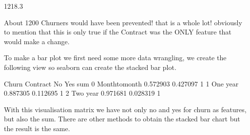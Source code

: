 \documentclass[letterpaper,10pt,english]{jupyterBook}
\begin{document}
\begin{sphinxVerbatim}[commandchars=\\\{\}]
\PYG{p}{[}\PYG{p}{]}
\end{sphinxVerbatim}

\begin{sphinxVerbatim}[commandchars=\\\{\}]
1218.3
\end{sphinxVerbatim}

\sphinxAtStartPar
About 1200 Churners would have been prevented! that is a whole lot! obviously to mention that this is only true if the Contract was the ONLY feature that would make a change.

\sphinxAtStartPar
To make a bar plot we first need some more data wrangling, we create the following view so seaborn can create the stacked bar plot.

\begin{sphinxVerbatim}[commandchars=\\\{\}]
  
\PYG{p}{[}\PYG{p}{]}  
\end{sphinxVerbatim}

\begin{sphinxVerbatim}[commandchars=\\\{\}]
Churn        Contract        No       Yes  sum
0      Month\PYGZhy{}to\PYGZhy{}month  0.572903  0.427097    1
1            One year  0.887305  0.112695    1
2            Two year  0.971681  0.028319    1
\end{sphinxVerbatim}

\sphinxAtStartPar
With this visualisation matrix we have not only no and yes for churn as features, but also the sum. There are other methods to obtain the stacked bar chart but the result is the same.
\end{document}
